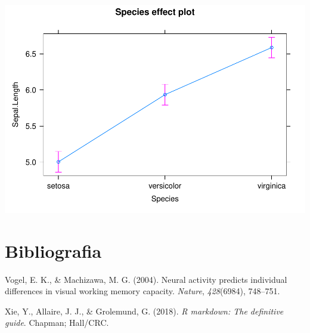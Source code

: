 \documentclass[
]{article}
\newlength{\cslhangindent}
\newlength{\cslentryspacingunit} %
\newenvironment{CSLReferences}[2] %
 {%
  \setlength{\parindent}{0pt}
  \ifodd #1
  \let\oldpar\par
  \def\par{\hangindent=\cslhangindent\oldpar}
  \fi
  \setlength{\parskip}{#2\cslentryspacingunit}
 }%
 {}
\begin{document}
\includegraphics{example-bookdown_files/figure-latex/unnamed-chunk-8-1.pdf}

\hypertarget{bibliografia}{%
\section{Bibliografia}\label{bibliografia}}

\hypertarget{refs}{}
\begin{CSLReferences}{1}{0}
\leavevmode{}%
Vogel, E. K., \& Machizawa, M. G. (2004). Neural activity predicts individual differences in visual working memory capacity. \emph{Nature}, \emph{428}(6984), 748--751.

\leavevmode{}%
Xie, Y., Allaire, J. J., \& Grolemund, G. (2018). \emph{R markdown: The definitive guide}. Chapman; Hall/CRC.

\end{CSLReferences}
\end{document}
